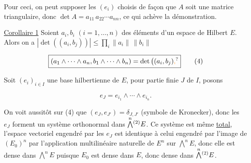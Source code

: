 
Pour ceci, on peut supposer les $(e_i)$ choisis de façon
que $A$ soit une matrice triangulaire, donc
$\det A=a_{11}\,a_{22}\cdots a_{nn}$, ce qui achève la démonstration.

\uline{Corollaire 1} Soient $a_i,b_i$ $(i=1,\ldots,n)$ des éléments d'un espace
de Hilbert $E$. Alors on a $|\det((a_i,b_j))|\leq\prod_i\|a_i\|\,\|b_i\|$

\[
\boxed{(a_1\wedge\cdots\wedge a_n,b_1\wedge\cdots\wedge b_n)=\det\big((a_i,b_j)\unsure{,}\big.} \tag*{(4)}
\]

Soit $(e_i)_{i\in I}$ une base hilbertienne  de  $E$, pour  partie
finie   $J$ de $I$, posons

\[
\boxed{e_J=e_{i_1}\wedge\cdots\wedge e_{i_n}}. \tag*{(5)}
\]

 On voit aussitôt sur (4) que
$(e_J,e_{J'})=\delta_{J,J'}$ (symbole de Kronecker), donc les
$e_J$ forment un système orthonormal dans $\overset{n}{\bigwedge}\vphantom{\bigwedge}^{(2)}E$. Ce système
est  même \uline{total},   l'espace vectoriel engendré
par les $e_J$  est identique à celui engendré par l'image
de $(E_0)^n$ par l'application multilinéaire naturelle de $E^n$
 sur $\overset{n}{\bigwedge}E$, donc elle est dense dans $\overset{n}{\bigwedge}E$ puisque
$E_0$ est dense dans $E$, donc dense dans $\overset{n}{\bigwedge}\vphantom{\bigwedge}^{(2)}E$.


